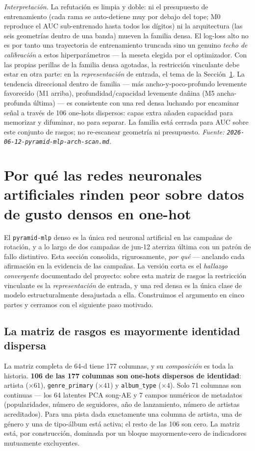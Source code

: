 \documentclass[11pt]{article}
\begin{document}
\emph{Interpretación.} La refutación es limpia y doble: ni el presupuesto de
entrenamiento (cada rama se auto-detiene muy por debajo del tope; M0 reproduce el
AUC sub-entrenado hasta todos los dígitos) ni la arquitectura (las seis
geometrías dentro de una banda) mueven la familia densa. El log-loss alto no es
por tanto una trayectoria de entrenamiento truncada sino un genuino \emph{techo de
calibración} a estos hiperparámetros --- la meseta elegida por el optimizador. Con
las propias perillas de la familia densa agotadas, la restricción vinculante debe
estar en otra parte: en la \emph{representación} de entrada, el tema de la
Sección~\ref{sec:anns}. La tendencia direccional dentro de familia --- más
ancho-y-poco-profundo levemente favorecido (M1 arriba), profundidad/capacidad
levemente dañina (M5 ancha-profunda última) --- es consistente con una red densa
luchando por encaminar señal a través de 106 one-hots dispersos: capas extra
añaden capacidad para memorizar y difuminar, no para separar. La familia está
cerrada para AUC sobre este conjunto de rasgos; no re-escanear geometría ni
presupuesto.
\emph{Fuente: \texttt{2026-06-12-pyramid-mlp-arch-scan.md}.}

\section{Por qué las redes neuronales artificiales rinden peor sobre datos de gusto densos en one-hot}
\label{sec:anns}
El \texttt{pyramid-mlp} denso es la única red neuronal artificial en las campañas
de rotación, y a lo largo de dos campañas de jun-12 aterriza última con un patrón
de fallo distintivo. Esta sección consolida, rigurosamente, \emph{por qué} ---
anclando cada afirmación en la evidencia de las campañas. La versión corta es el
\emph{hallazgo convergente} documentado del proyecto: sobre esta matriz de rasgos
la restricción vinculante es la \emph{representación} de entrada, y una red densa
es la única clase de modelo estructuralmente desajustada a ella. Construimos el
argumento en cinco partes y cerramos con el siguiente paso motivado.

\subsection{La matriz de rasgos es mayormente identidad dispersa}
\label{sec:anns-matrix}
La matriz completa de 64-d tiene 177 columnas, y su \emph{composición} es toda la
historia. \textbf{106 de las 177 columnas son one-hots dispersos de identidad}:
artista ($\times 61$), \texttt{genre\_primary} ($\times 41$) y
\texttt{album\_type} ($\times 4$). Solo 71 columnas son continuas --- los 64
latentes PCA song-AE y 7 campos numéricos de metadatos (popularidades, número de
seguidores, año de lanzamiento, número de artistas acreditados). Para una pista
dada exactamente una columna de artista, una de género y una de tipo-álbum está
activa; el resto de las 106 son cero. La matriz está, por construcción, dominada
por un bloque mayormente-cero de indicadores mutuamente excluyentes.
\end{document}
